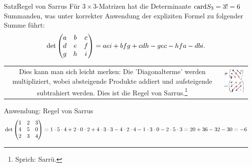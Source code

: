 \begin{Satz}
{Satz}{Regel von Sarrus}
Für $3\times3$-Matrizen hat die Determinante $\text{card} S_3=3!=6$ Summanden, was unter korrekter Anwendung der expliziten Formel zu folgender Summe führt:
\begin{equation}
    \det\begin{pmatrix}a&b&c\\d&e&f\\g&h&i\end{pmatrix}= aei+bfg+cdh-gec-hfa-dbi.\label{eq:Sarrusregel}
\end{equation}
\begin{tabular}{c l}
\parbox[b]{12cm}{
Dies kann man sich leicht merken: Die 'Diagonalterme' werden multipliziert, wobei absteigende Produkte addiert und aufsteigende subtrahiert werden. Dies ist die Regel von Sarrus.\footnote{Sprich: Sarrü.}
} & \includegraphics[width=.15\textwidth]{Dateien/00/14Sarrus.PNG}
\end{tabular}
\end{Satz}
\begin{Beispiel}
{Anwendung: Regel von Sarrus}
\begin{equation*}
    \det\begin{pmatrix}1&2&3\\4&5&0\\2&3&4\end{pmatrix}=1\cdot5\cdot4+2\cdot0\cdot2+4\cdot3\cdot3-4\cdot2\cdot4-1\cdot3\cdot0-2\cdot5\cdot3=20+36-32-30=-6
\end{equation*}
\end{Beispiel}
